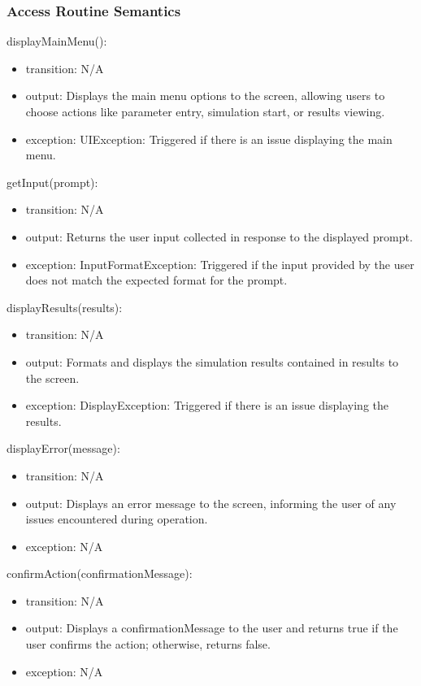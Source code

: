\documentclass[12pt, titlepage]{article}
\begin{document}
\subsubsection{Access Routine Semantics}

\noindent displayMainMenu():
\begin{itemize}
\item transition: N/A
\item output: Displays the main menu options to the screen, allowing users to choose actions like parameter entry, simulation start, or results viewing.
\item exception: UIException: Triggered if there is an issue displaying the main menu.
\end{itemize}

\noindent getInput(prompt):
\begin{itemize}
\item transition: N/A
\item output: Returns the user input collected in response to the displayed prompt.
\item exception: InputFormatException: Triggered if the input provided by the user does not match the expected format for the prompt.
\end{itemize}

\noindent displayResults(results):
\begin{itemize}
\item transition: N/A
\item output: Formats and displays the simulation results contained in results to the screen.
\item exception: DisplayException: Triggered if there is an issue displaying the results.
\end{itemize}

\noindent displayError(message):
\begin{itemize}
\item transition: N/A
\item output: Displays an error message to the screen, informing the user of any issues encountered during operation.
\item exception: N/A
\end{itemize}

\noindent confirmAction(confirmationMessage):
\begin{itemize}
\item transition: N/A
\item output: Displays a confirmationMessage to the user and returns true if the user confirms the action; otherwise, returns false.
\item exception: N/A
\end{itemize}
\end{document}
